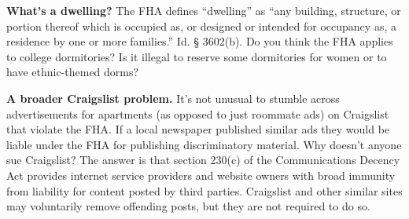 
\item \textbf{What's a dwelling?} The FHA defines ``dwelling'' as ``any
building, structure, or portion thereof which is occupied as, or designed or
intended for occupancy as, a residence by one or more families.'' Id. {\S}
3602(b).  Do you think the FHA applies to college dormitories?  Is it illegal
to reserve some dormitories for women or to have ethnic-themed dorms?  


\item \textbf{A broader Craigslist problem.} It's not unusual to stumble across
advertisements for apartments (as opposed to just roommate ads) on Craigslist
that violate the FHA.  If a local newspaper published similar ads they would be
liable under the FHA for publishing discriminatory material.  Why doesn't
anyone sue Craigslist?  The answer is that section 230(c) of the Communications
Decency Act provides internet service providers and website owners with broad
immunity from liability for content posted by third parties.  Craigslist and
other similar sites may voluntarily remove offending posts, but they are not
required to do so.  

